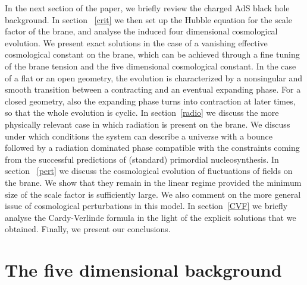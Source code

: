 \documentclass[a4paper,11pt]{article}
\begin{document}
In the next section of the paper, we briefly review the charged AdS black
hole background. In section ~\ref{crit} we then set up the Hubble equation
for the scale factor of the brane, and analyse the induced four
dimensional cosmological evolution. We present exact solutions in the case
of a vanishing effective cosmological constant on the brane, which can be
achieved through a fine tuning of the brane tension and the five
dimensional cosmological constant. In the case of a flat or an open
geometry, the evolution is characterized by a nonsingular and smooth
transition between a contracting and an eventual expanding phase. For a
closed geometry, also the expanding phase turns into contraction at later
times, so that the whole evolution is cyclic. In section~\ref{radio} we
discuss the more physically relevant case in which radiation is present on
the brane. We discuss under which conditions the system can describe a
universe with a bounce followed by a radiation dominated phase compatible
with the constraints coming from the successful predictions of (standard)
primordial nucleosynthesis. In section ~\ref{pert} we discuss the
cosmological evolution of fluctuations of fields on the brane. We show
that they remain in the linear regime provided the minimum size of the
scale factor is sufficiently large. We also comment on the more general
issue of cosmological perturbations in this model. In section~\ref{CVF} we
briefly analyse the Cardy-Verlinde formula in the light of the explicit
solutions that we obtained. Finally, we present our conclusions.


\section{The five dimensional background\label{EPS}}
\end{document}
